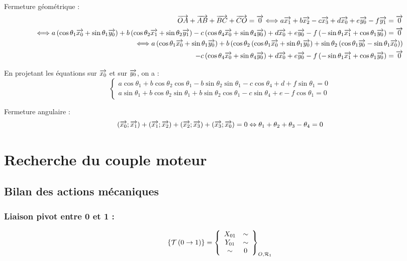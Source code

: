 \documentclass[10pt,fleqn]{article} %
\begin{document}
Fermeture géométrique : 
\begin{eqnarray*}
\overrightarrow{OA}+\overrightarrow{AB}+\overrightarrow{BC}+\overrightarrow{CO}=\overrightarrow{0} 
\Longleftrightarrow
a \overrightarrow{x_{1}} +  b \overrightarrow{x_{2}}-c \overrightarrow{x_{3}} + d \overrightarrow{x_{0}} + e\overrightarrow{y_{0}} -f \overrightarrow{y_{1}}=\overrightarrow{0}  \\
\Longleftrightarrow a \left(\cos \theta_1 \overrightarrow{x_{0}} + \sin\theta_1 \overrightarrow{y_{0}} \right) 
+b \left( \cos \theta_2 \overrightarrow{x_{1}} + \sin\theta_2 \overrightarrow{y_{1}}\right)
- c \left(\cos \theta_4 \overrightarrow{x_{0}} + \sin\theta_4 \overrightarrow{y_{0}} \right) 
+d \overrightarrow{x_{0}} 
+e \overrightarrow{y_{0}}
-f \left( -\sin \theta_1 \overrightarrow{x_{1}} + \cos\theta_1 \overrightarrow{y_{0}}\right)
 =\overrightarrow{0} \\
\Longleftrightarrow a \left(\cos \theta_1 \overrightarrow{x_{0}} + \sin\theta_1 \overrightarrow{y_{0}} \right) 
+b \left( \cos \theta_2 \left(\cos \theta_1 \overrightarrow{x_{0}} + \sin\theta_1 \overrightarrow{y_{0}} \right) + \sin\theta_2 \left(\cos \theta_1 \overrightarrow{y_{0}} - \sin\theta_1 \overrightarrow{x_{0}} \right)\right)\\
- c \left(\cos \theta_4 \overrightarrow{x_{0}} + \sin\theta_4 \overrightarrow{y_{0}} \right) 
+d \overrightarrow{x_{0}} 
+e \overrightarrow{y_{0}} 
-f \left( -\sin \theta_1 \overrightarrow{x_{1}} + \cos\theta_1 \overrightarrow{y_{0}}\right)
=\overrightarrow{0} \\
\end{eqnarray*}

En projetant les équations sur $\overrightarrow{x_0}$ et sur $\overrightarrow{y_0}$, on a :
$$
\left\{
\begin{array}{l}
a \cos \theta_1 + b\cos \theta_2 \cos \theta_1 
-b \sin\theta_2 \sin\theta_1 - c \cos \theta_4  
+d 
+f\sin \theta_1 
 =0  \\
a \sin\theta_1 + b\cos \theta_2 \sin\theta_1 + b\sin\theta_2 \cos \theta_1  
- c \sin\theta_4 +e 
-f\cos \theta_1 = 0
\end{array}
\right.
$$

Fermeture angulaire : 
$$
\left(\overrightarrow{x_{0}};\overrightarrow{x_{1}} \right)+\left(\overrightarrow{x_{1}};\overrightarrow{x_{2}} \right)
+\left(\overrightarrow{x_{2}};\overrightarrow{x_{3}} \right)+\left(\overrightarrow{x_{3}};\overrightarrow{x_{0}} \right) = 0
\Leftrightarrow 
\theta_1 +\theta_2 + \theta_3 - \theta_4 = 0
$$
\section{Recherche du couple moteur}

\subsection{Bilan des actions mécaniques}

\subsubsection*{Liaison pivot entre 0 et 1 :}
$$
\left\{\mathcal{T} \left(0\rightarrow 1 \right) \right\}
=\left\{ \begin{array}{cc} {X_{01}} & {\sim}\\{Y_{01}} & {\sim}\\{\sim} & {0}\\\end{array} \right\}_{O,\mathcal{R}_1}
$$
\end{document}

